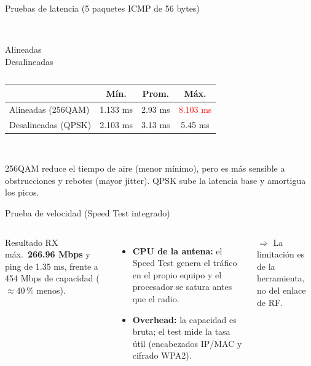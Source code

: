 \begin{frame}{Pruebas de latencia (5 paquetes ICMP de 56 bytes)}
  \begin{columns}[c]
    \centering
    \\ {\scriptsize Alineadas}
    \centering
    \\ {\scriptsize Desalineadas}
  \end{columns}
  \vspace{4pt}
  \centering\small
  \begin{tabular}{@{}lccc@{}}
    \toprule
     & \textbf{Mín.} & \textbf{Prom.} & \textbf{Máx.} \\ \midrule
    Alineadas (256QAM) & 1.133 ms & 2.93 ms & \textcolor{red}{8.103 ms} \\
    Desalineadas (QPSK) & 2.103 ms & 3.13 ms & 5.45 ms \\
    \bottomrule
  \end{tabular}\\[3pt]
  \raggedright\small 256QAM reduce el tiempo de aire (menor mínimo), pero es más sensible a
  obstrucciones y rebotes (mayor jitter). QPSK sube la latencia base y amortigua los picos.
\end{frame}

\begin{frame}{Prueba de velocidad (Speed Test integrado)}
  \begin{columns}[c]
    \centering
    \small
    \begin{block}{Resultado}
      RX máx.\ \textbf{266.96 Mbps} y ping de 1.35 ms, frente a 454 Mbps de capacidad
      ($\approx$40\,\% menos).
    \end{block}
    \begin{itemize}
      \item \textbf{CPU de la antena:} el Speed Test genera el tráfico en el propio equipo y
            el procesador se satura antes que el radio.
      \item \textbf{Overhead:} la capacidad es bruta; el test mide la tasa útil
            (encabezados IP/MAC y cifrado WPA2).
    \end{itemize}
    $\Rightarrow$ La limitación es de la herramienta, no del enlace de RF.
  \end{columns}
\end{frame}

